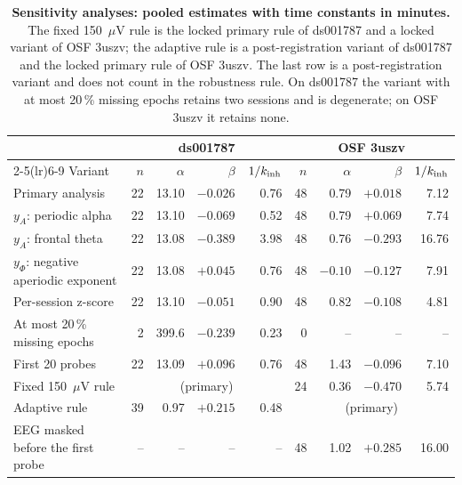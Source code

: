 \begin{table}[t]
\caption{\textbf{Sensitivity analyses: pooled estimates with time constants in minutes.} The fixed 150~$\mu$V rule is the locked primary rule of ds001787 and a locked variant of OSF 3uszv; the adaptive rule is a post-registration variant of ds001787 and the locked primary rule of OSF 3uszv. The last row is a post-registration variant and does not count in the robustness rule. On ds001787 the variant with at most 20\,\% missing epochs retains two sessions and is degenerate; on OSF 3uszv it retains none.}
\label{tab:sens}
\centering\footnotesize
\setlength{\tabcolsep}{5pt}
\begin{tabular}{lrrrrrrrr}
\toprule
 & \multicolumn{4}{c}{ds001787} & \multicolumn{4}{c}{OSF 3uszv} \\
\cmidrule(lr){2-5}\cmidrule(lr){6-9}
Variant & $n$ & $\alpha$ & $\beta$ & $1/k_{\mathrm{inh}}$ & $n$ & $\alpha$ & $\beta$ & $1/k_{\mathrm{inh}}$ \\
\midrule
Primary analysis                     & 22 & 13.10 & $-0.026$ & 0.76 & 48 & 0.79 & $+0.018$ & 7.12 \\
$y_A$: periodic alpha                & 22 & 13.10 & $-0.069$ & 0.52 & 48 & 0.79 & $+0.069$ & 7.74 \\
$y_A$: frontal theta                 & 22 & 13.08 & $-0.389$ & 3.98 & 48 & 0.76 & $-0.293$ & 16.76 \\
$y_\Phi$: negative aperiodic exponent & 22 & 13.08 & $+0.045$ & 0.76 & 48 & $-0.10$ & $-0.127$ & 7.91 \\
Per-session z-score                  & 22 & 13.10 & $-0.051$ & 0.90 & 48 & 0.82 & $-0.108$ & 4.81 \\
At most 20\,\% missing epochs        &  2 & 399.6 & $-0.239$ & 0.23 &  0 & -- & -- & -- \\
First 20 probes                      & 22 & 13.09 & $+0.096$ & 0.76 & 48 & 1.43 & $-0.096$ & 7.10 \\
Fixed 150~$\mu$V rule                & \multicolumn{4}{c}{(primary)} & 24 & 0.36 & $-0.470$ & 5.74 \\
Adaptive rule                        & 39 & 0.97 & $+0.215$ & 0.48 & \multicolumn{4}{c}{(primary)} \\
EEG masked before the first probe    & -- & -- & -- & -- & 48 & 1.02 & $+0.285$ & 16.00 \\
\bottomrule
\end{tabular}
\end{table}

